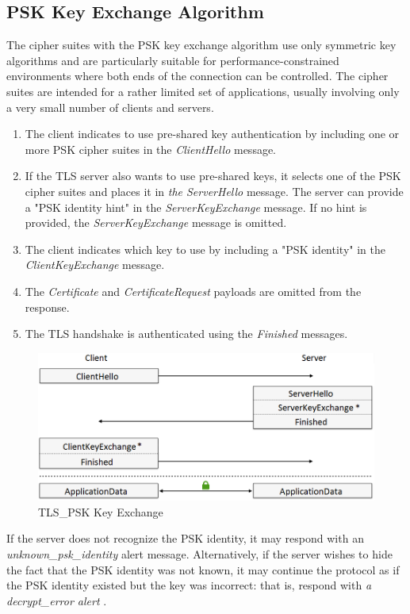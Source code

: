 \documentclass[
  digital, %
  notable,   %
  lof,     %
  lot,     %
]{fithesis3}
\begin{document}
\subsection{PSK Key Exchange Algorithm}\label{pskAlgorithm}
The cipher suites with the PSK key exchange algorithm use only symmetric key algorithms and 
are particularly suitable for performance-constrained environments where both ends of the 
connection can be controlled. The cipher suites are intended for a rather limited set of 
applications, usually involving only a very small number of clients and servers.

\begin{enumerate}
\item The client indicates to use pre-shared key authentication by including one or more PSK cipher suites in the \textit{ClientHello} message. 
\item If the TLS server also wants to use pre-shared keys, it selects one of the PSK cipher suites and places it in \textit{the ServerHello} message. The server can provide a "PSK identity hint" in the \textit{ServerKeyExchange} message. If no hint is provided, the \textit{ServerKeyExchange} message is omitted.
\item The client indicates which key to use by including a "PSK identity" in the \textit{ClientKeyExchange} message.
\item The \textit{Certificate} and \textit{CertificateRequest} payloads are omitted from the response.
\item The TLS handshake is authenticated using the \textit{Finished} messages. 
\end{enumerate}

\begin{figure}[th]
	\centering
  	\includegraphics[width=1.05\textwidth]{psk-edited}%
   \caption{TLS\_PSK Key Exchange}
\end{figure}

If the server does not recognize the PSK identity, it may respond with an 
\textit{unknown\_psk\_identity} alert message.  Alternatively, if the server wishes to hide 
the fact that the PSK identity was not known, it may continue the protocol as if the PSK 
identity existed but the key was incorrect: that is, respond with \textit{a decrypt\_error 
alert} \cite{eronen2005pre}. 
\end{document}
